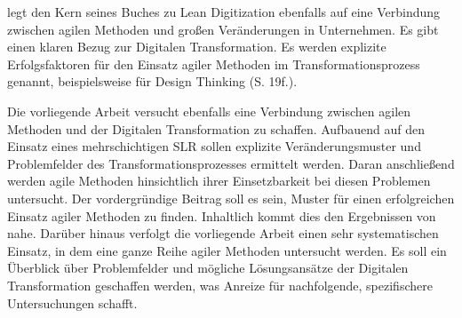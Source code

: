  legt den Kern seines Buches zu Lean Digitization ebenfalls auf eine Verbindung zwischen agilen Methoden und großen Veränderungen in Unternehmen. Es gibt einen klaren Bezug zur Digitalen Transformation. Es werden explizite Erfolgsfaktoren für den Einsatz agiler Methoden im Transformationsprozess genannt, beispielsweise für Design Thinking (S. 19f.). 

Die vorliegende Arbeit versucht ebenfalls eine Verbindung zwischen agilen Methoden und der Digitalen Transformation zu schaffen. Aufbauend auf den Einsatz eines mehrschichtigen SLR sollen explizite Veränderungsmuster und Problemfelder des Transformationsprozesses ermittelt werden. Daran anschließend werden agile Methoden hinsichtlich ihrer Einsetzbarkeit bei diesen Problemen untersucht. Der vordergründige Beitrag soll es sein, Muster für einen erfolgreichen Einsatz agiler Methoden zu finden. Inhaltlich kommt dies den Ergebnissen von  nahe. Darüber hinaus verfolgt die vorliegende Arbeit einen sehr systematischen Einsatz, in dem eine ganze Reihe agiler Methoden untersucht werden. Es soll ein Überblick über Problemfelder und mögliche Lösungsansätze der Digitalen Transformation geschaffen werden, was Anreize für nachfolgende, spezifischere Untersuchungen schafft.
